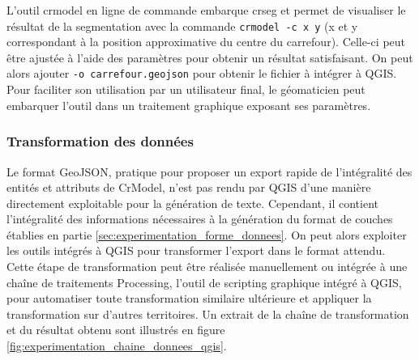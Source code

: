 \newpar{}

L'outil crmodel en ligne de commande embarque crseg et permet de visualiser le résultat de la segmentation avec la commande \texttt{crmodel -c x y} (x et y correspondant à la position approximative du centre du carrefour). Celle-ci peut être ajustée à l'aide des paramètres pour obtenir un résultat satisfaisant. On peut alors ajouter \texttt{-o carrefour.geojson} pour obtenir le fichier à intégrer à QGIS. Pour faciliter son utilisation par un utilisateur final, le géomaticien peut embarquer l'outil dans un traitement graphique exposant ses paramètres.

\subsubsection{Transformation des données}

Le format GeoJSON, pratique pour proposer un export rapide de l'intégralité des entités et attributs de CrModel, n'est pas rendu par QGIS d'une manière directement exploitable pour la génération de texte. Cependant, il contient l'intégralité des informations nécessaires à la génération du format de couches établies en partie \ref{sec:experimentation_forme_donnees}. On peut alors exploiter les outils intégrés à QGIS pour transformer l'export dans le format attendu. Cette étape de transformation peut être réalisée manuellement ou intégrée à une chaîne de traitements Processing, l'outil de scripting graphique intégré à QGIS, pour automatiser toute transformation similaire ultérieure et appliquer la transformation sur d'autres territoires. Un extrait de la chaîne de transformation et du résultat obtenu sont illustrés en figure \ref{fig:experimentation_chaine_donnees_qgis}.


